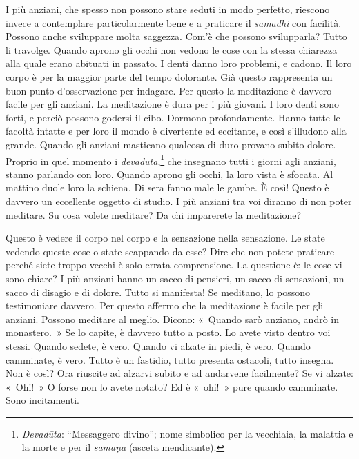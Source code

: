 I più anziani, che spesso non possono stare seduti in modo perfetto,
riescono invece a contemplare particolarmente bene e a praticare il
\emph{samādhi} con facilità. Possono anche sviluppare molta saggezza.
Com'è che possono svilupparla? Tutto li travolge. Quando aprono gli
occhi non vedono le cose con la stessa chiarezza alla quale erano
abituati in passato. I denti danno loro problemi, e cadono. Il loro
corpo è per la maggior parte del tempo dolorante. Già questo rappresenta
un buon punto d'osservazione per indagare. Per questo la meditazione è
davvero facile per gli anziani. La meditazione è dura per i più giovani.
I loro denti sono forti, e perciò possono godersi il cibo. Dormono
profondamente. Hanno tutte le facoltà intatte e per loro il mondo è
divertente ed eccitante, e così s'illudono alla grande. Quando gli
anziani masticano qualcosa di duro provano subito dolore. Proprio in
quel momento i \emph{devadūta},\footnote{\emph{Devadūta}: ``Messaggero divino''; nome simbolico per la
  vecchiaia, la malattia e la morte e per il \emph{samaṇa} (asceta
  mendicante).} che insegnano tutti i giorni agli anziani, stanno
parlando con loro. Quando aprono gli occhi, la loro vista è sfocata. Al
mattino duole loro la schiena. Di sera fanno male le gambe. È così!
Questo è davvero un eccellente oggetto di studio. I più anziani tra voi
diranno di non poter meditare. Su cosa volete meditare? Da chi
imparerete la meditazione?

Questo è vedere il corpo nel corpo e la sensazione nella sensazione. Le
state vedendo queste cose o state scappando da esse? Dire che non potete
praticare perché siete troppo vecchi è solo errata comprensione. La
questione è: le cose vi sono chiare? I più anziani hanno un sacco di
pensieri, un sacco di sensazioni, un sacco di disagio e di dolore. Tutto
si manifesta! Se meditano, lo possono testimoniare davvero. Per questo
affermo che la meditazione è facile per gli anziani. Possono meditare al
meglio. Dicono: «~Quando sarò anziano, andrò in monastero.~» Se lo
capite, è davvero tutto a posto. Lo avete visto dentro voi stessi.
Quando sedete, è vero. Quando vi alzate in piedi, è vero. Quando
camminate, è vero. Tutto è un fastidio, tutto presenta ostacoli, tutto
insegna. Non è così? Ora riuscite ad alzarvi subito e ad andarvene
facilmente? Se vi alzate: «~Ohi!~» O forse non lo avete notato? Ed è
«~ohi!~» pure quando camminate. Sono incitamenti.

